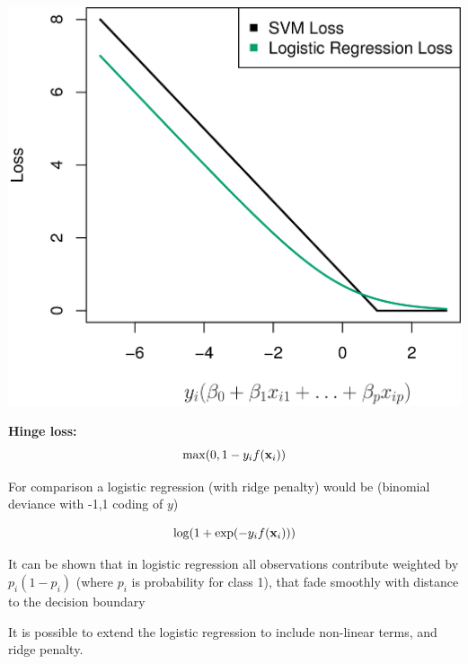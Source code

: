 \documentclass[ignorenonframetext,]{beamer}
\begin{document}
\begin{frame}

\includegraphics{../ISLR/Chapter9/9.12.png}

\end{frame}

\begin{frame}

\textbf{Hinge loss:} \[\max(0,1-y_if({\bf x}_i))\]

For comparison a logistic regression (with ridge penalty) would be
(binomial deviance with -1,1 coding of \(y\))

\[ \log(1+\exp(-y_i f({\bf x}_i)))\]

It can be shown that in logistic regression all observations contribute
weighted by \(p_i(1-p_i)\) (where \(p_i\) is probability for class 1),
that fade smoothly with distance to the decision boundary

It is possible to extend the logistic regression to include non-linear
terms, and ridge penalty.

\end{frame}
\end{document}
